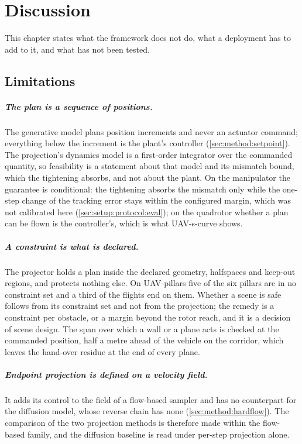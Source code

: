 \chapter{Discussion}\label{ch:discussion}

This chapter states what the framework does not do, what a deployment has to add to it, and what has
not been tested.

\section{Limitations}\label{sec:disc:limitations}

\paragraph{The plan is a sequence of positions.} The generative model plans position increments and
never an actuator command; everything below the increment is the plant's controller
(\autoref{sec:method:setpoint}). The projection's dynamics model is a first-order integrator over the
commanded quantity, so feasibility is a statement about that model and its mismatch bound, which the
tightening absorbs, and not about the plant. On the manipulator the guarantee is conditional: the tightening
absorbs the mismatch only while the one-step change of the tracking error stays within the configured margin,
which was not calibrated here (\autoref{sec:setup:protocol:eval}); on the quadrotor whether a plan can be flown is the
controller's, which is what UAV-s-curve shows.

\paragraph{A constraint is what is declared.} The projector holds a plan inside the declared geometry,
halfspaces and keep-out regions, and protects nothing else. On UAV-pillars five of the six pillars are
in no constraint set and a third of the flights end on them. Whether a scene is safe follows from its
constraint set and not from the projection; the remedy is a constraint per obstacle, or a margin beyond
the rotor reach, and it is a decision of scene design. The span over which a wall or a plane acts is
checked at the commanded position, half a metre ahead of the vehicle on the corridor, which leaves the
hand-over residue at the end of every plane.

\paragraph{Endpoint projection is defined on a velocity field.} It adds its control to the field of a
flow-based sampler and has no counterpart for the diffusion model, whose reverse chain has none
(\autoref{sec:method:hardflow}). The comparison of the two projection methods is therefore made within
the flow-based family, and the diffusion baseline is read under per-step projection alone.

